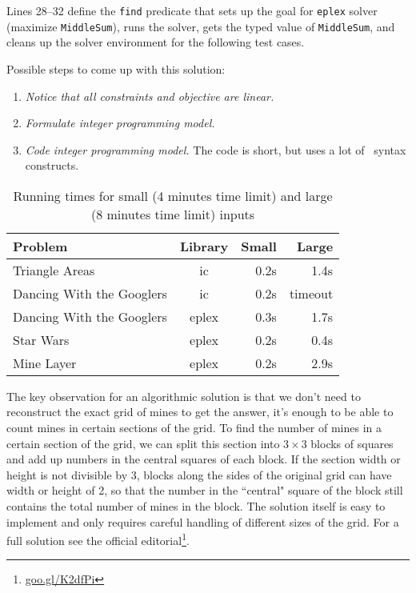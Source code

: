 \documentclass{acm_proc_article-sp}
\begin{document}
Lines 28--32 define the \texttt{find} predicate that sets up the goal for \texttt{eplex} solver (maximize \texttt{MiddleSum}), runs the solver, 
gets the typed value of \texttt{MiddleSum}, and cleans up the solver environment for the following test cases. 

Possible steps to come up with this solution:

\begin{enumerate}
\item \textit{Notice that all constraints and objective are linear.}
\item \textit{Formulate integer programming model.}
\item \textit{Code integer programming model.} The code is short, but uses a lot of \eclipse\ syntax constructs.
\end{enumerate}

\begin{table}
\centering
\caption{Running times for small (4 minutes time limit) and large (8 minutes time limit) inputs\protect\footnotemark}
\label{table:times}
\begin{tabular}{lcrr}
\hline
Problem        & Library &  Small   & Large \\
\hline
Triangle Areas & ic      & 0.2s & 1.4s \\

Dancing With 
the Googlers   & ic      & 0.2s & timeout \\

Dancing With 
the Googlers   & eplex   & 0.3s & 1.7s \\

Star Wars      & eplex   & 0.2s & 0.4s \\

Mine Layer     & eplex   & 0.2s & 2.9s \\
\hline
\end{tabular}
\end{table}

The key observation for an algorithmic solution is that we don't need to reconstruct the exact grid of mines to get the answer, 
it's enough to be able to count mines in certain sections of the grid. 
To find the number of mines in a certain section of the grid, we can split this section into $3 \times 3$ blocks of squares and add up numbers in the central squares of each block. 
If the section width or height is not divisible by 3, blocks along the sides of the original grid can have width or height of 2, 
so that the number in the ``central" square of the block still contains the total number of mines in the block. 
The solution itself is easy to implement and only requires careful handling of different sizes of the grid. 
For a full solution see the official editorial\footnote{\url{goo.gl/K2dfPi}}.
\end{document}

